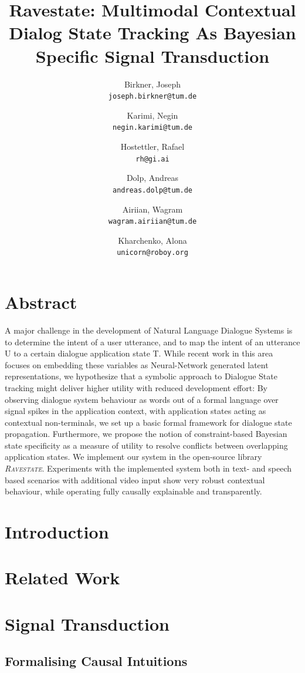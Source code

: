 \documentclass{article}
\title{Ravestate: Multimodal Contextual Dialog State Tracking As Bayesian Specific Signal Transduction}
\author{
	Birkner, Joseph \\ \texttt{joseph.birkner@tum.de}
	\and
	Karimi, Negin \\ \texttt{negin.karimi@tum.de}
	\and
	Hostettler, Rafael \\ \texttt{rh@gi.ai}
	\and
	Dolp, Andreas \\ \texttt{andreas.dolp@tum.de}
	\and
	Airiian, Wagram\\ \texttt{wagram.airiian@tum.de}
	\and
	Kharchenko, Alona \\ \texttt{unicorn@roboy.org}
}
\date{\vspace{-5ex}}
\newcommand{\rasta}{\textit{\textsc{Ravestate}}\xspace}
\begin{document}
\maketitle
\hrulefill

\begin{multicols}{2}

\section{Abstract}

A major challenge in the development of Natural Language Dialogue Systems is to determine the intent of a user utterance, and to map the intent of an utterance U to a certain dialogue application state T.
While recent work in this area focuses on embedding these variables as Neural-Network generated latent representations, we hypothesize that a symbolic approach to Dialogue State tracking might deliver higher utility with reduced development effort:
By observing dialogue system behaviour as words out of a formal language over signal spikes in the application context, with application states acting as contextual non-terminals, we set up a basic formal framework for dialogue state propagation.
Furthermore, we propose the notion of constraint-based Bayesian state specificity as a measure of utility to resolve conflicts between overlapping application states. We implement our system in the open-source library \rasta.
Experiments with the implemented system both in text- and speech based scenarios with additional video input show very robust contextual behaviour, while operating fully causally explainable and transparently.

\section{Introduction}


\section{Related Work}


\section{Signal Transduction}

\subsection{Formalising Causal Intuitions}


\end{multicols}
\end{document}
